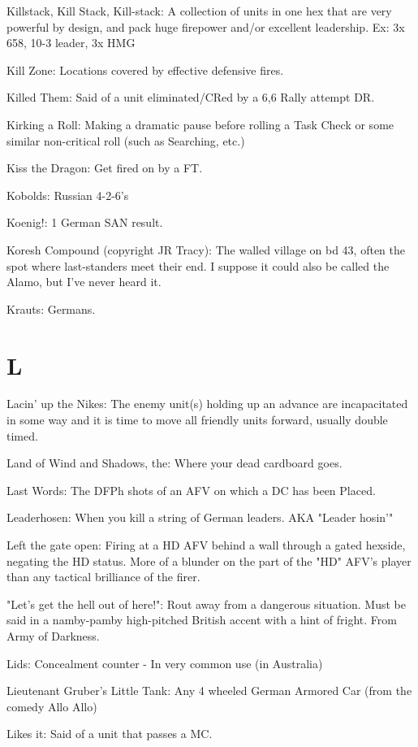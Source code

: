 \documentclass[letterpaper]{article}
\begin{document}
Killstack, Kill Stack, Kill-stack: A collection of units in one hex that are very powerful by design, and pack huge firepower and/or excellent leadership. Ex: 3x 658, 10-3 leader, 3x HMG

Kill Zone: Locations covered by effective defensive fires.

Killed Them: Said of a unit eliminated/CRed by a 6,6 Rally attempt DR.

Kirking a Roll:  Making a dramatic pause before rolling a Task Check or some similar non-critical roll (such as Searching, etc.)

Kiss the Dragon: Get fired on by a FT.

Kobolds: Russian 4-2-6's

Koenig!: 1 German SAN result.

Koresh Compound (copyright JR Tracy): The walled village on bd 43, often the spot where last-standers meet their end. I suppose it could also be called the Alamo, but I've never heard it.

Krauts: Germans.

\section{L}

Lacin' up the Nikes: The enemy unit(s) holding up an advance are incapacitated in some way and it is time to move all friendly units forward, usually double timed.

Land of Wind and Shadows, the:  Where your dead cardboard goes.

Last Words: The DFPh shots of an AFV on which a DC has been Placed.

Leaderhosen: When you kill a string of German leaders. AKA "Leader hosin'"

Left the gate open: Firing at a HD AFV behind a wall through a gated hexside, negating the HD status. More of a blunder on the part of the "HD" AFV's player than any tactical brilliance of the firer.

"Let's get the hell out of here!": Rout away from a dangerous situation. Must be said in a namby-pamby high-pitched British accent with a hint of fright. From Army of Darkness.

Lids: Concealment counter - In very common use (in Australia)

Lieutenant Gruber's Little Tank: Any 4 wheeled German Armored Car (from the comedy Allo Allo)

Likes it: Said of a unit that passes a MC.
\end{document}
